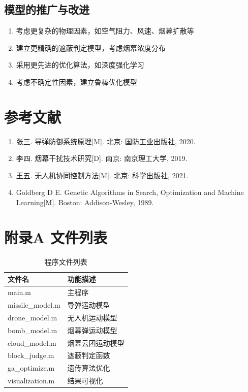 \documentclass[12pt,a4paper]{article}
\begin{document}
\subsection{模型的推广与改进}

\begin{enumerate}
    \item 考虑更复杂的物理因素，如空气阻力、风速、烟幕扩散等
    \item 建立更精确的遮蔽判定模型，考虑烟幕浓度分布
    \item 采用更先进的优化算法，如深度强化学习
    \item 考虑不确定性因素，建立鲁棒优化模型
\end{enumerate}

\section*{参考文献}

\begin{enumerate}
    \item 张三. 导弹防御系统原理[M]. 北京: 国防工业出版社, 2020.
    \item 李四. 烟幕干扰技术研究[D]. 南京: 南京理工大学, 2019.
    \item 王五. 无人机协同控制方法[M]. 北京: 科学出版社, 2021.
    \item Goldberg D E. Genetic Algorithms in Search, Optimization and Machine Learning[M]. Boston: Addison-Wesley, 1989.
\end{enumerate}

\section*{附录A 文件列表}

\begin{table}[H]
\centering
\caption{程序文件列表}
\begin{tabular}{ll}
\toprule
文件名 & 功能描述 \\
\midrule
main.m & 主程序 \\
missile\_model.m & 导弹运动模型 \\
drone\_model.m & 无人机运动模型 \\
bomb\_model.m & 烟幕弹运动模型 \\
cloud\_model.m & 烟幕云团运动模型 \\
block\_judge.m & 遮蔽判定函数 \\
ga\_optimize.m & 遗传算法优化 \\
visualization.m & 结果可视化 \\
\bottomrule
\end{tabular}
\end{table}
\end{document}
